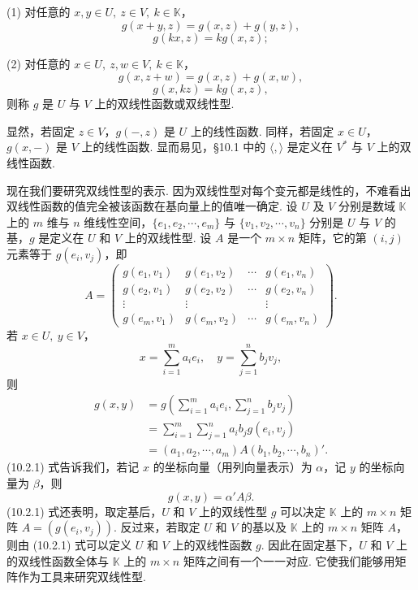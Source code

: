 \documentclass[UTF8,12pt,a4paper,fontset=fandol]{ctexart}
\begin{document}
(1) 对任意的 $x,y\in U,\ z\in V,\ k\in\mathbb K$，
\[
  g(x+y,z)=g(x,z)+g(y,z),
\]
\[
  g(kx,z)=kg(x,z);
\]

(2) 对任意的 $x\in U,\ z,w\in V,\ k\in\mathbb K$，
\[
  g(x,z+w)=g(x,z)+g(x,w),
\]
\[
  g(x,kz)=kg(x,z),
\]
则称 $g$ 是 $U$ 与 $V$ 上的双线性函数或双线性型.

显然，若固定 $z\in V$，$g(-,z)$ 是 $U$ 上的线性函数. 同样，若固定 $x\in U$，$g(x,-)$ 是 $V$ 上的线性函数. 显而易见，§10.1 中的 $\langle,\rangle$ 是定义在 $V^*$ 与 $V$ 上的双线性函数.

现在我们要研究双线性型的表示. 因为双线性型对每个变元都是线性的，不难看出双线性函数的值完全被该函数在基向量上的值唯一确定. 设 $U$ 及 $V$ 分别是数域 $\mathbb K$ 上的 $m$ 维与 $n$ 维线性空间，$\{e_1,e_2,\cdots,e_m\}$ 与 $\{v_1,v_2,\cdots,v_n\}$ 分别是 $U$ 与 $V$ 的基，$g$ 是定义在 $U$ 和 $V$ 上的双线性型. 设 $A$ 是一个 $m\times n$ 矩阵，它的第 $(i,j)$ 元素等于 $g(e_i,v_j)$，即
\[
  A=\left(\begin{array}{cccc}
  g(e_1,v_1)&g(e_1,v_2)&\cdots&g(e_1,v_n)\\
  g(e_2,v_1)&g(e_2,v_2)&\cdots&g(e_2,v_n)\\
  \vdots&\vdots&&\vdots\\
  g(e_m,v_1)&g(e_m,v_2)&\cdots&g(e_m,v_n)
  \end{array}\right).
\]
若 $x\in U,\ y\in V$，
\[
  x=\sum_{i=1}^m a_ie_i,\quad y=\sum_{j=1}^n b_jv_j,
\]
则
\begin{equation}
\begin{aligned}
  g(x,y)&=g\left(\sum_{i=1}^m a_ie_i,\sum_{j=1}^n b_jv_j\right)\\
  &=\sum_{i=1}^m\sum_{j=1}^n a_ib_jg(e_i,v_j)\\
  &=(a_1,a_2,\cdots,a_m)A(b_1,b_2,\cdots,b_n)'.
\end{aligned}
\tag{10.2.1}
\end{equation}
(10.2.1) 式告诉我们，若记 $x$ 的坐标向量（用列向量表示）为 $\alpha$，记 $y$ 的坐标向量为 $\beta$，则
\begin{equation}
  g(x,y)=\alpha' A\beta.
  \tag{10.2.2}
\end{equation}
(10.2.1) 式还表明，取定基后，$U$ 和 $V$ 上的双线性型 $g$ 可以决定 $\mathbb K$ 上的 $m\times n$ 矩阵 $A=(g(e_i,v_j))$. 反过来，若取定 $U$ 和 $V$ 的基以及 $\mathbb K$ 上的 $m\times n$ 矩阵 $A$，则由 (10.2.1) 式可以定义 $U$ 和 $V$ 上的双线性函数 $g$. 因此在固定基下，$U$ 和 $V$ 上的双线性函数全体与 $\mathbb K$ 上的 $m\times n$ 矩阵之间有一个一一对应. 它使我们能够用矩阵作为工具来研究双线性型.
\end{document}
